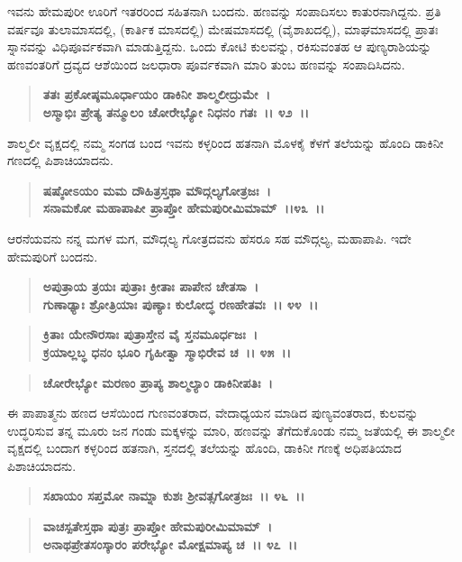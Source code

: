 ಇವನು ಹೇಮಪುರೀ ಊರಿಗೆ ಇತರರಿಂದ ಸಹಿತನಾಗಿ ಬಂದನು. ಹಣವನ್ನು ಸಂಪಾದಿಸಲು ಕಾತುರನಾಗಿದ್ದನು. ಪ್ರತಿ ವರ್ಷವೂ ತುಲಾಮಾಸದಲ್ಲಿ, (ಕಾರ್ತಿಕ ಮಾಸದಲ್ಲಿ) ಮೇಷಮಾಸದಲ್ಲಿ (ವೈಶಾಖದಲ್ಲಿ), ಮಾಘಮಾಸದಲ್ಲಿ ಪ್ರಾತಃ ಸ್ನಾನವನ್ನು ವಿಧಿಪೂರ್ವಕವಾಗಿ ಮಾಡುತ್ತಿದ್ದನು. ಒಂದು ಕೋಟಿ ಕುಲವನ್ನು, ರಕಿಸುವಂತಹ ಆ ಪುಣ್ಯರಾಶಿಯನ್ನು ಹಣವಂತರಿಗೆ ದ್ರವ್ಯದ ಆಶೆಯಿಂದ ಜಲಧಾರಾ ಪೂರ್ವಕವಾಗಿ ಮಾರಿ ತುಂಬ ಹಣವನ್ನು ಸಂಪಾದಿಸಿದನು.

\begin{verse}
\textbf{ತತಃ ಪ್ರಕೋಷ್ಠಮೂರ್ಧಾಯಂ ಡಾಕಿನೀ ಶಾಲ್ಮಲೀದ್ರುಮೇ~।}\\\textbf{ಅಸ್ಮಾಭಿಃ ಪ್ರೇತ್ಯ ತನ್ಮೂಲಂ ಚೋರೇಭ್ಯೋ ನಿಧನಂ ಗತಃ~।। ೪೨~।। }
\end{verse}

ಶಾಲ್ಮಲೀ ವೃಕ್ಷದಲ್ಲಿ ನಮ್ಮ ಸಂಗಡ ಬಂದ ಇವನು ಕಳ್ಳರಿಂದ ಹತನಾಗಿ ಮೊಳಕೈ ಕೆಳಗೆ ತಲೆಯನ್ನು ಹೊಂದಿ ಡಾಕಿನೀ ಗಣದಲ್ಲಿ ಪಿಶಾಚಿಯಾದನು.

\begin{verse}
\textbf{ಷಷ್ಠೋಽಯಂ ಮಮ ದೌಹಿತ್ರಸ್ತಥಾ ಮೌದ್ಗಲ್ಯಗೋತ್ರಜಃ~।}\\\textbf{ಸನಾಮಕೋ ಮಹಾಪಾಪೀ ಪ್ರಾಪ್ತೋ ಹೇಮಪುರೀಮಿಮಾಮ್~।।೪೩~।। }
\end{verse}

ಆರನೆಯವನು ನನ್ನ ಮಗಳ ಮಗ, ಮೌದ್ಗಲ್ಯ ಗೋತ್ರದವನು ಹೆಸರೂ ಸಹ ಮೌದ್ಗಲ್ಯ, ಮಹಾಪಾಪಿ. ಇದೇ ಹೇಮಪುರಿಗೆ ಬಂದನು.

\begin{verse}
\textbf{ಅಪುತ್ರಾಯ ತ್ರಯಃ ಪುತ್ರಾಃ ಕ್ರೀತಾಃ ಪಾಪೇನ ಚೇತಸಾ~।}\\\textbf{ಗುಣಾಢ್ಯಾಃ ಶ್ರೋತ್ರಿಯಾಃ ಪುಣ್ಯಾಃ ಕುಲೋದ್ಧ ರಣಹೇತವಃ~।। ೪೪~।।} 
\end{verse}

\begin{verse}
\textbf{ಕ್ರಿತಾಃ ಯೇನೌರಸಾಃ ಪುತ್ರಾಸ್ತೇನ ವೈ ಸ್ತನಮೂರ್ಧಜಃ~।}\\\textbf{ಕ್ರಯಾಲ್ಲಬ್ಧ ಧನಂ ಭೂರಿ ಗೃಹೀತ್ವಾ ಸ್ಮಾಭಿರೇವ ಚ~।। ೪೫~।। }
\end{verse}

\begin{verse}
\textbf{ಚೋರೇಭ್ಯೋ ಮರಣಂ ಪ್ರಾಪ್ಯ ಶಾಲ್ಮಲ್ಯಾಂ ಡಾಕಿನೀಪತಿಃ~।}
\end{verse}

ಈ ಪಾಪಾತ್ಮನು ಹಣದ ಆಸೆಯಿಂದ ಗುಣವಂತರಾದ, ವೇದಾಧ್ಯಯನ ಮಾಡಿದ ಪುಣ್ಯವಂತರಾದ, ಕುಲವನ್ನು ಉದ್ಧರಿಸುವ ತನ್ನ ಮೂರು ಜನ ಗಂಡು ಮಕ್ಕಳನ್ನು ಮಾರಿ, ಹಣವನ್ನು ತೆಗೆದುಕೊಂಡು ನಮ್ಮ ಜತೆಯಲ್ಲಿ ಈ ಶಾಲ್ಮಲೀ ವೃಕ್ಷದಲ್ಲಿ ಬಂದಾಗ ಕಳ್ಳರಿಂದ ಹತನಾಗಿ, ಸ್ತನದಲ್ಲಿ ತಲೆಯನ್ನು ಹೊಂದಿ, ಡಾಕಿನೀ ಗಣಕ್ಕೆ ಅಧಿಪತಿಯಾದ ಪಿಶಾಚಿಯಾದನು.

\begin{verse}
\textbf{ಸಖಾಯಂ ಸಪ್ತಮೋ ನಾಮ್ನಾ ಕುಶಃ ಶ‍್ರೀವತ್ಸಗೋತ್ರಜಃ~।। ೪೬~।। }
\end{verse}

\begin{verse}
\textbf{ವಾಚಸ್ಪತೇಸ್ತಥಾ ಪುತ್ರಃ ಪ್ರಾಪ್ತೋ ಹೇಮಪುರೀಮಿಮಾಮ್~।}\\\textbf{ಅನಾಥಪ್ರೇತಸಂಸ್ಕಾರಂ ಪರೇಭ್ಯೋ ಮೋಕ್ಷಮಾಪ್ಯ ಚ~।। ೪೭~।। }
\end{verse}

